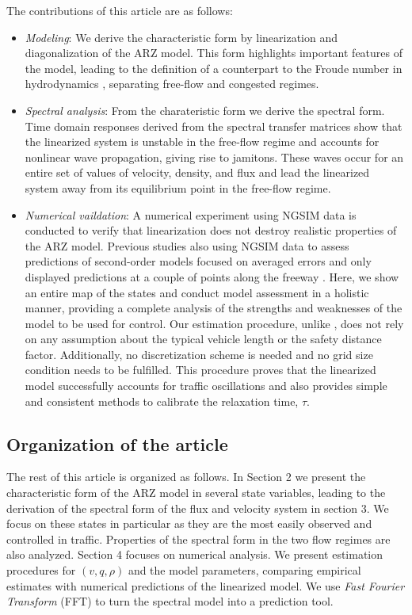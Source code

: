 \documentclass[preprint]{elsarticle}
\begin{document}
The contributions of this article are as follows:

\begin{itemize}
\item \textit{Modeling}: We derive the characteristic form by linearization and diagonalization of the ARZ model. This form highlights important features of the model, leading to the definition of a counterpart to the Froude number in hydrodynamics \cite{litrico2009modeling}, separating free-flow and congested regimes.  

\item \textit{Spectral analysis}: From the charateristic form we derive the spectral form. Time domain responses derived from the spectral transfer matrices show that the linearized system is unstable in the free-flow regime and accounts for nonlinear wave propagation, giving rise to jamitons. These waves occur for an entire set of values of velocity, density, and flux and lead the linearized system away from its equilibrium point in the free-flow regime. 

\item \textit{Numerical vaildation}: A numerical experiment using NGSIM data is conducted to verify that linearization does not destroy realistic properties of the ARZ model. Previous studies also using NGSIM data to assess predictions of second-order models focused on averaged errors and only displayed predictions at a couple of points along the freeway \cite{GodunovARZ,Fan}. Here, we show an entire map of the states and conduct model assessment in a holistic manner, providing a complete analysis of the strengths and weaknesses of the model to be used for control. Our estimation procedure, unlike \cite{Fan}, does not rely on any assumption about the typical vehicle length or the safety distance factor. Additionally, no discretization scheme is needed and no grid size condition needs to be fulfilled. This procedure proves that the linearized model successfully accounts for traffic oscillations and also provides simple and consistent methods to calibrate the relaxation time, $\tau$.
\end{itemize}

\subsection{Organization of the article}
The rest of this article is organized as follows. In Section 2 we present the characteristic form of the ARZ model in several state variables, leading to the derivation of the spectral form of the flux and velocity system in section 3. We focus on these states in particular as they are the most easily observed and controlled in traffic. Properties of the spectral form in the two flow regimes are also analyzed. Section 4 focuses on numerical analysis. We present estimation procedures for $(v,q,\rho)$ and the model parameters, comparing empirical estimates with numerical predictions of the linearized model. We use \textit{Fast Fourier Transform} (FFT) to turn the spectral model into a prediction tool.
\end{document}
